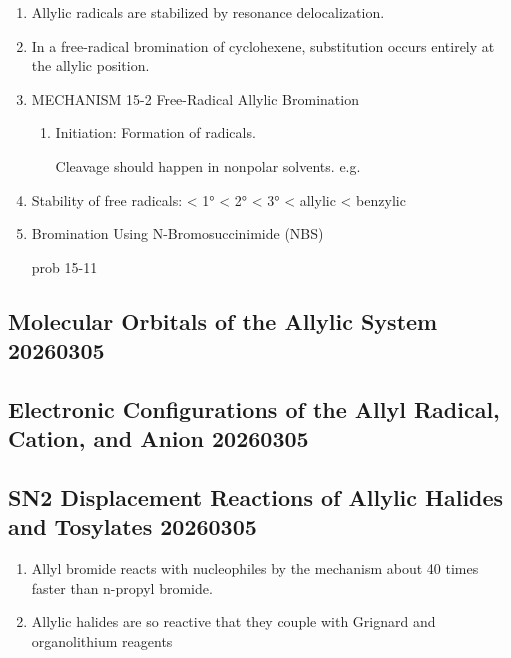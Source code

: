 \begin{enumerate}
    \item Allylic radicals are stabilized by resonance delocalization.
    \item In a free-radical bromination of cyclohexene, substitution occurs entirely at the allylic position.
    \item MECHANISM 15-2 Free-Radical Allylic Bromination
    \begin{enumerate}
        \item Initiation: Formation of radicals. 
        \begin{note}
            Cleavage should happen in nonpolar solvents. e.g. 
        \end{note}
    \end{enumerate}
    \item Stability of free radicals:  < 1° < 2° < 3° < allylic < benzylic
    \item Bromination Using N-Bromosuccinimide (NBS)
    \begin{example}
        prob 15-11
    \end{example}

\end{enumerate}

\subsection{Molecular Orbitals of the Allylic System 20260305}

\subsection{Electronic Configurations of the Allyl Radical, Cation, and Anion 20260305}

\subsection{SN2 Displacement Reactions of Allylic Halides and Tosylates 20260305} %

\begin{enumerate}
    \item Allyl bromide reacts with nucleophiles by the mechanism about 40 times faster than n-propyl bromide. %
    \item Allylic halides are so reactive that they couple with Grignard and organolithium reagents
\end{enumerate}

